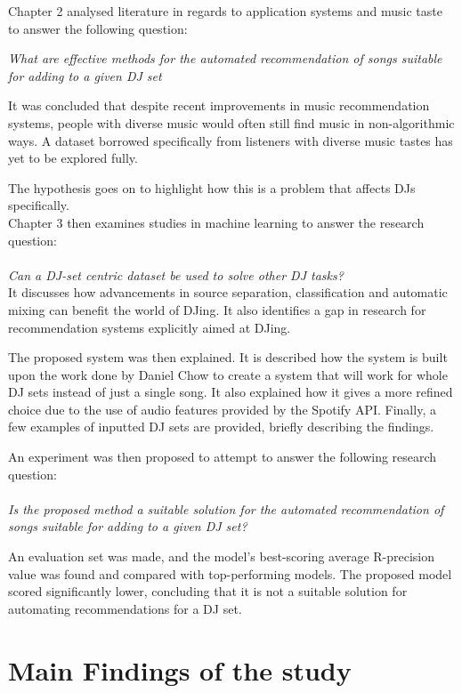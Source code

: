 Chapter 2 analysed literature in regards to application systems and music taste to answer the following question: 

\textit{What are effective methods for the automated recommendation of songs suitable
	for adding to a given DJ set}

It was concluded that despite recent improvements in music recommendation systems, people with diverse music would often still find music in non-algorithmic ways. A dataset borrowed specifically from listeners with diverse music tastes has yet to be explored fully.

The hypothesis goes on to highlight how this is a problem that affects DJs specifically.
\\

Chapter 3 then examines studies in machine learning to answer the research question:
\\
\\
\textit{Can a DJ-set centric dataset be used to solve other DJ tasks?}
\\
It discusses how advancements in source separation, classification and automatic mixing can benefit the world of DJing. It also identifies a gap in research for recommendation systems explicitly aimed at DJing.

The proposed system was then explained. It is described how the system is built upon the work done by Daniel Chow to create a system that will work for whole DJ sets instead of just a single song. It also explained how it gives a more refined choice due to the use of audio features provided by the Spotify API. Finally, a few examples of inputted DJ sets are provided, briefly describing the findings. 

An experiment was then proposed to attempt to answer the following research question:
\\
\\
\textit{Is the proposed method a suitable solution for the automated recommendation of songs suitable for adding to a given DJ set?}

An evaluation set was made, and the model's best-scoring average R-precision value was found and compared with top-performing models. The proposed model scored significantly lower, concluding that it is not a suitable solution for automating recommendations for a DJ set.

\section{Main Findings of the study}

